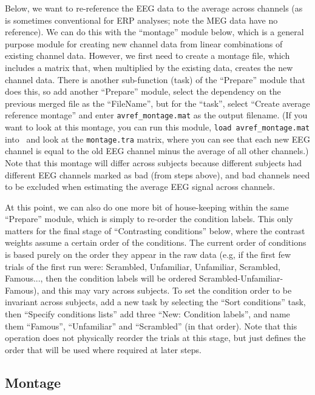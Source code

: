 Below, we want to re-reference the EEG data to the average across channels (as is sometimes conventional for ERP analyses; note the MEG data have no reference). We can do this with the ``montage'' module below, which is a general purpose module for creating new channel data from linear combinations of existing channel data. However, we first need to create a montage file, which includes a matrix that, when multiplied by the existing data, creates the new channel data. There is another sub-function (task) of the ``Prepare'' module that does this, so add another ``Prepare'' module, select the dependency on the previous merged file as the ``FileName'', but for the ``task'', select ``Create average reference montage'' and enter \texttt{avref\_montage.mat} as the output filename. (If you want to look at this montage, you can run this module, \texttt{load avref\_montage.mat} into \matlab\ and look at the \texttt{montage.tra} matrix, where you can see that each new EEG channel is equal to the old EEG channel minus the average of all other channels.)  Note that this montage will differ across subjects because different subjects had different EEG channels marked as bad (from steps above), and bad channels need to be excluded when estimating the average EEG signal across channels.

At this point, we can also do one more bit of house-keeping within the same ``Prepare'' module, which is simply to re-order the condition labels. This only matters for the final stage of ``Contrasting conditions'' below, where the contrast weights assume a certain order of the conditions. The current order of conditions is based purely on the order they appear in the raw data (e.g, if the first few trials of the first run were: Scrambled, Unfamiliar, Unfamiliar, Scrambled, Famous..., then the condition labels will be ordered Scrambled-Unfamiliar-Famous), and this may vary across subjects. To set the condition order to be invariant across subjects, add a new task by selecting the ``Sort conditions'' task, then ``Specify conditions lists'' add three ``New: Condition labels'', and name them ``Famous'', ``Unfamiliar'' and ``Scrambled'' (in that order). Note that this operation does not physically reorder the trials at this stage, but just defines the order that will be used where required at later steps.

\subsection{Montage}


